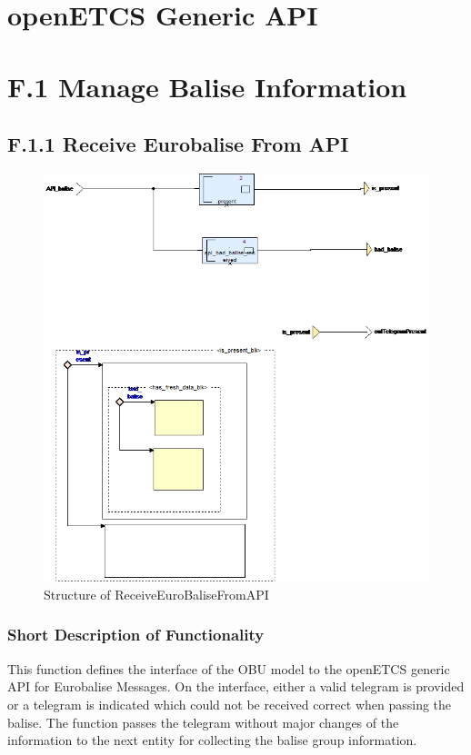 \documentclass{template/openetcs_report}
\begin{document}
\section{openETCS Generic API}



\section{F.1 Manage Balise Information}


\subsection{F.1.1 Receive Eurobalise From API}

\begin{figure}[hbtp]
\centering
\includegraphics[width=.9\textwidth]{../images/ReceiveEuroBaliseFromAPI_diagram.png}
\caption{Structure of ReceiveEuroBaliseFromAPI}
\end{figure}
\subsubsection{Short Description of Functionality}
This function defines the interface of the OBU model to the openETCS generic API for Eurobalise Messages. On the interface, either a valid telegram is provided or a telegram is indicated which could not be received correct when passing the balise. The function passes the telegram without major changes of the information to the next entity for collecting the balise group information.
	
\end{document}
